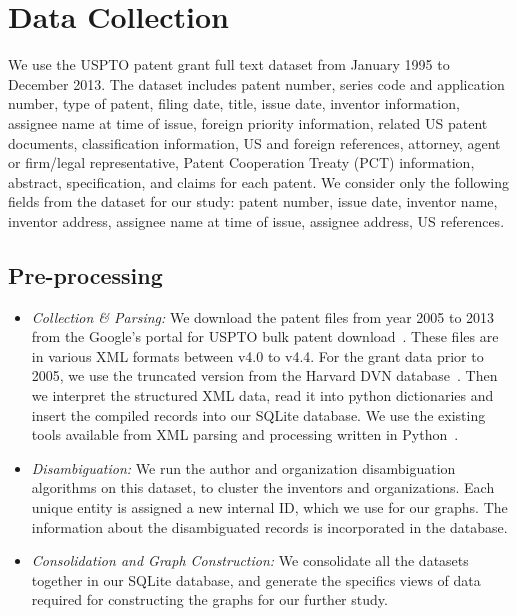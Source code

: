 \section{Data Collection}

We use the USPTO patent grant full text dataset from January 1995 to December 
2013.  The dataset includes patent number, series code and application number,
type of patent, filing date, title, issue date, inventor information, assignee
name at time of issue, foreign priority information, related US patent
documents, classification information, US and foreign references, attorney,
agent or firm/legal representative, Patent Cooperation Treaty (PCT)
information, abstract, specification, and claims for each patent. We consider
only the following fields from the dataset for our study: patent number, issue
date, inventor name, inventor address, assignee name at time of issue, assignee address, US
references. 


\subsection{Pre-processing}

\begin{itemize}
\item {\em Collection \& Parsing:} We download the patent files from year 2005 to 2013 from the Google's portal for USPTO bulk patent download~\cite{google-uspto}. These files are in various XML formats between v4.0 to v4.4. For the grant data prior to 2005, we use the truncated version from the Harvard DVN database~\cite{harvardDVN}. Then we interpret the structured XML data, read it into python dictionaries and insert the compiled records into our SQLite database. We use the existing tools available from XML parsing and processing written in Python~\cite{funginstitute, fungpaper}. 

\item {\em Disambiguation:} We run the author and organization disambiguation algorithms on this dataset, to cluster the inventors and organizations. Each unique entity is assigned a new internal ID, which we use for our graphs. The information about the disambiguated records is incorporated in the database. 

\item {\em Consolidation and Graph Construction:} 
We consolidate all the datasets together in our SQLite database, and generate the specifics views of data required for constructing the graphs for our further study.
\end{itemize}

